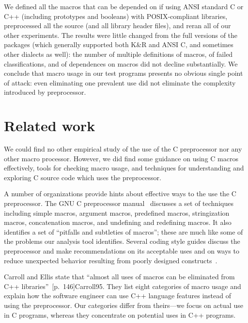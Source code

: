 \documentclass[10pt]{article}
\begin{document}
We defined all the macros that can be depended on if using ANSI standard C
or C++ (including prototypes and booleans) with POSIX-compliant libraries,
preprocessed all the source (and all library header files), and reran all
of our other experiments.  The results were little changed from the full
versions of the packages (which generally supported both K\&R and ANSI C,
and sometimes other dialects as well): the number of multiple definitions
of macros, of failed classifications, and of dependences on macros did not
decline substantially.  We conclude that macro usage in our test programs
presents no obvious single point of attack:  even eliminating one prevalent
use did not eliminate the complexity introduced by preprocessor.


\section{Related work}
\label{sec:related}


We could find no other empirical study of the use of the C preprocessor
nor any other macro processor.  However, we did find some guidance on
using C macros effectively, tools for checking macro usage, and
techniques for understanding and exploring C source code which uses the
preprocessor.

A number of organizations provide hints about effective ways to the use
the C preprocessor.  The GNU C preprocessor manual~\cite{cpp-manual}
discusses a set of techniques including simple macros, argument macros,
predefined macros, stringization macros, concatenation macros, and
undefining and redefining macros.  It also identifies a set of
``pitfalls and subtleties of macros''; these are much like some of the
problems our analysis tool identifies.  Several coding style guides
discuss the preprocessor and make recommendations on its acceptable uses
and on ways to reduce unexpected behavior resulting from poorly
designed constructs~\cite{Stallman97,ellemtel92,Cannon95,Dolenc90}.

Carroll and Ellis state that ``almost all uses of macros can be
eliminated from C++ libraries''~[p.~146]{Carroll95}.  They list eight
categories of macro usage and explain how the software engineer can use
C++ language features instead of using the preprocessor.  Our categories
differ from theirs---we focus on actual use in C programs, whereas they
concentrate on potential uses in C++ programs.
\end{document}
